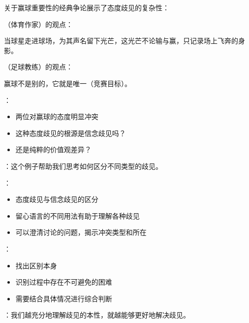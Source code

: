 \begin{examplebox}[title=体育哲学中的态度歧见]
关于赢球重要性的经典争论展示了态度歧见的复杂性：

（体育作家）的观点：
\begin{displayquote}
当球星走进球场，为其声名留下光芒，这光芒不论输与赢，只记录场上飞奔的身影。
\end{displayquote}

（足球教练）的观点：
\begin{displayquote}
赢球不是别的，它就是唯一（竞赛目标）。
\end{displayquote}

：
\begin{itemize}
  \item 两位对赢球的态度明显冲突
  \item 这种态度歧见的根源是信念歧见吗？
  \item 还是纯粹的价值观差异？
\end{itemize}

：这个例子帮助我们思考如何区分不同类型的歧见。
\end{examplebox}

\begin{theorembox}[title=歧见分析的价值与局限]
：
\begin{itemize}
  \item 态度歧见与信念歧见的区分
  \item 留心语言的不同用法有助于理解各种歧见
  \item 可以澄清讨论的问题，揭示冲突类型和所在
\end{itemize}

：
\begin{itemize}
  \item 找出区别本身
  \item 识别过程中存在不可避免的困难
  \item 需要结合具体情况进行综合判断
\end{itemize}

：我们越充分地理解歧见的本性，就越能够更好地解决歧见。
\end{theorembox}

